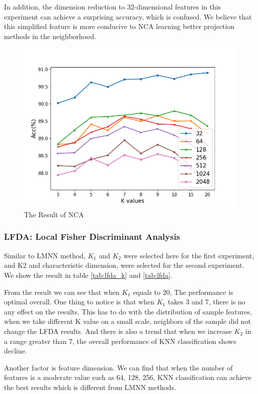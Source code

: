     In addition, the dimension reduction to 32-dimensional features in this experiment can achieve a surprising accuracy, which is confused. We believe that this simplified feature is more conducive to NCA learning better projection methods in the neighborhood.
    \begin{figure}[htbp]
        \centering
        \includegraphics[width=0.6\linewidth]{img/NCA_res.png}
        \caption{The Result of NCA}
        \label{fig:nca_res}
    \end{figure}



\subsubsection{LFDA: Local Fisher Discriminant Analysis}
        Similar to LMNN method, $K_1$ and $K_2$ were selected here for the first experiment, and K2 and characteristic dimension, were selected for the second experiment. We show the result in table \ref{tab:lfda_k} and \ref{tab:lfda}.
        
        From the result we can see that when $K_1$ equals to 20, The performance is optimal overall. One thing to notice is that when $K_1$ takes 3 and 7, there is no any effect on the results. This has to do with the distribution of sample features, when we take different K value on a small scale, neighbors of the sample did not change the LFDA results. And there is also a trend that when we increase $K_2$ in a range greater than 7, the overall performance of KNN classification shows decline.
        
         Another factor is feature dimension. We can find that when the number of features is a moderate value such as 64, 128, 256, KNN classification can achieve the best results which is different from LMNN methods.
        
